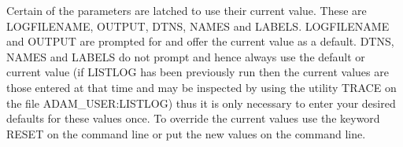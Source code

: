 {{         Certain of the parameters are latched to use their current
           value. These are LOGFILENAME, OUTPUT, DTNS, NAMES and LABELS.
           LOGFILENAME and OUTPUT are prompted for and offer the current
           value as a default. DTNS, NAMES and LABELS do not prompt and
           hence always use the default or current value (if LISTLOG has
           been previously run then the current values are those entered at
           that time and may be inspected by using the utility TRACE on the
           file ADAM\_USER:LISTLOG) thus it is only necessary to enter your
           desired defaults for these values once. To override the current
           values use the keyword RESET on the command line or put the new
           values on the command line.
   }
}

\newpage
\label{des:makebias}
